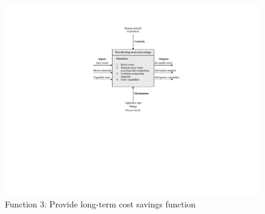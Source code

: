 \documentclass[a4paper,11pt,fleqn]{report}
\begin{document}
%
\begin{figure}[h!]
\begin{center}
\includegraphics[scale = 0.8]{Function3.pdf}
\caption{Function 3: Provide long-term cost savings function}
\label{fig: Function3}
\end{center}
\end{figure}
\end{document}
